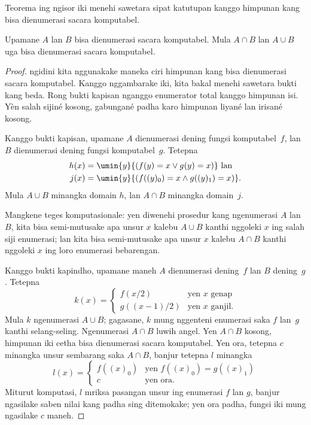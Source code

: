 \documentclass[../../../include/open-logic-section]{subfiles}
\begin{document}


Teorema ing ngisor iki menehi sawetara sipat
katutupan kanggo himpunan kang bisa dienumerasi
sacara komputabel.

\begin{thm}
Upamane $A$ lan $B$ bisa dienumerasi sacara
komputabel. Mula $A \cap B$ lan $A \cup B$
uga bisa dienumerasi sacara komputabel.
\end{thm}

\begin{proof}
 ngidini kita
nggunakake maneka ciri himpunan kang bisa
dienumerasi sacara komputabel. Kanggo
nggambarake iki, kita bakal menehi sawetara
bukti kang beda. Rong bukti kapisan nganggo enumerator total kanggo himpunan isi. Yèn salah sijiné kosong, gabungané padha karo himpunan liyané lan irisané kosong.

Kanggo bukti kapisan, upamane $A$ dienumerasi
dening fungsi komputabel~$f$, lan $B$
dienumerasi dening fungsi komputabel~$g$.
Tetepna
\begin{align*}
h(x) & = \umin{y}{(f(y) = x \lor g(y) = x)} \text{ lan}\\
j(x) & = \umin{y}{(f((y)_0) = x \land g((y)_1) = x)}.
\end{align*}
Mula $A \cup B$ minangka domain $h$,
lan $A \cap B$ minangka domain~$j$.

\begin{explain}
Mangkene teges komputasionale: yen diwenehi
prosedur kang ngenumerasi $A$ lan $B$,
kita bisa semi-mutusake apa unsur $x$
kalebu $A \cup B$ kanthi nggoleki $x$
ing salah siji enumerasi; lan kita bisa
semi-mutusake apa unsur $x$ kalebu
$A \cap B$ kanthi nggoleki $x$ ing
loro enumerasi bebarengan.
\end{explain}

Kanggo bukti kapindho, upamane maneh $A$
dienumerasi dening~$f$ lan $B$ dening~$g$.
Tetepna
\[
k(x) = \begin{cases}
f(x/2) & \text{yen $x$ genap} \\
g((x-1)/2) & \text{yen $x$ ganjil.}
\end{cases}
\]
Mula $k$ ngenumerasi $A \cup B$;
gagasane, $k$ mung nggenteni enumerasi
saka $f$ lan~$g$ kanthi selang-seling.
Ngenumerasi $A \cap B$ luwih angel.
Yen $A \cap B$ kosong, himpunan iki
cetha bisa dienumerasi sacara komputabel.
Yen ora, tetepna $c$ minangka unsur
sembarang saka $A \cap B$, banjur
tetepna $l$ minangka
\[
l(x) = \begin{cases}
f((x)_0) & \text{yen $f((x)_0) = g((x)_1)$} \\
c & \text{yen ora.}
\end{cases}
\]
Miturut komputasi, $l$ mriksa pasangan
unsur ing enumerasi $f$ lan $g$,
banjur ngasilake saben nilai kang
padha sing ditemokake; yen ora padha, fungsi
iki mung ngasilake $c$ maneh.


\end{proof}
\end{document}
